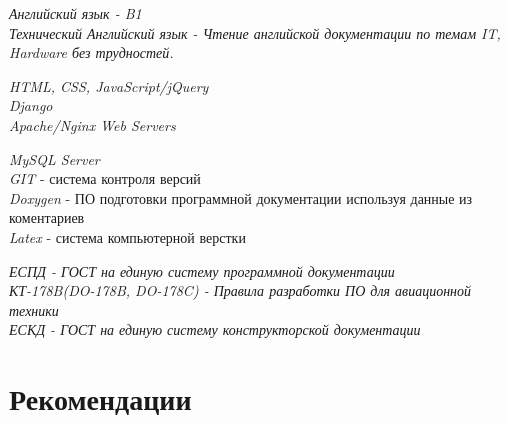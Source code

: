 {
\textit{Английский язык - B1}\\
\textit{Технический Английский язык - Чтение английской документации по темам IT, Hardware без трудностей.}
}


{
\textit{HTML, CSS, JavaScript/jQuery}\\
\textit{Django}\\
\textit{Apache/Nginx Web Servers}\\
}


{
\textit{MySQL Server}\\
\textit{GIT} - система контроля версий\\
\textit{Doxygen} - ПО подготовки программной документации используя данные из коментариев\\
\textit{Latex} - система компьютерной верстки

}


{
\textit{ЕСПД - ГОСТ на единую систему программной документации}\\
\textit{КТ-178B(DO-178B, DO-178C) - Правила разработки ПО для авиационной техники}\\
\textit{ЕСКД - ГОСТ на единую систему конструкторской документации}\\
}



\section{Рекомендации}

